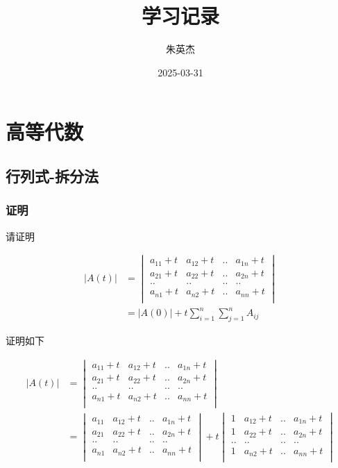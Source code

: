 \documentclass[12pt,a4paper]{ctexart}
\title{学习记录}
\author{朱英杰}
\date{2025-03-31}
\begin{document}
\maketitle
\tableofcontents

\section{高等代数}

\subsection{行列式-拆分法}

\subsubsection{证明}

请证明

\begin{align*}
    \left| A(t)\right| &= \begin{vmatrix}
        a_{11} + t & a_{12} + t & .. & a_{1n} + t \\
        a_{21} + t & a_{22} + t & .. & a_{2n} + t \\
        .. & .. & .. & .. \\
        a_{n1} + t & a_{n2} + t & .. & a_{nn} + t \\
    \end{vmatrix} \\
    &= \lvert A(0) \rvert + t\sum_{i=1}^{n}\sum_{j=1}^{n}A_{ij}
\end{align*}

证明如下

\begin{align*}
    \left| A(t)\right| &= \begin{vmatrix}
        a_{11} + t & a_{12} + t & .. & a_{1n} + t \\
        a_{21} + t & a_{22} + t & .. & a_{2n} + t \\
        .. & .. & .. & .. \\
        a_{n1} + t & a_{n2} + t & .. & a_{nn} + t \\
    \end{vmatrix} \\
    &=  \begin{vmatrix}
        a_{11}  & a_{12} + t & .. & a_{1n} + t \\
        a_{21}  & a_{22} + t & .. & a_{2n} + t \\
        .. & .. & .. & .. \\
        a_{n1} & a_{n2} + t & .. & a_{nn} + t \\
    \end{vmatrix}  + t \begin{vmatrix}
        1  & a_{12} + t & .. & a_{1n} + t \\
        1  & a_{22} + t & .. & a_{2n} + t \\
        .. & .. & .. & .. \\
        1 & a_{n2} + t & .. & a_{nn} + t \\
    \end{vmatrix}
\end{align*}
\end{document}

